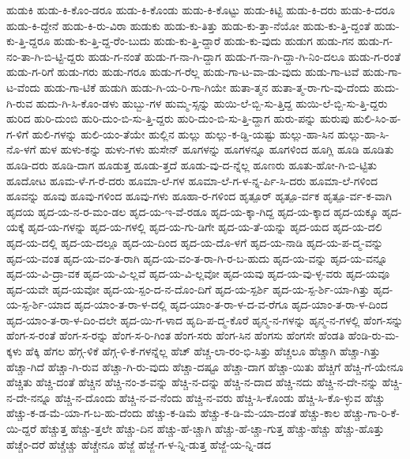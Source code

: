 {ಹುಡುಕಿ
ಹುಡು-ಕಿ-ಕೊಂ-ಡರೂ
ಹುಡು-ಕಿ-ಕೊಂಡು
ಹುಡು-ಕಿ-ಕೊಟ್ಟು
ಹುಡು-ಕಿಟ್ಟಿ
ಹುಡು-ಕಿ-ದರು
ಹುಡು-ಕಿ-ದರೂ
ಹುಡು-ಕಿ-ದ್ದೇನೆ
ಹುಡು-ಕಿ-ರು-ವಿರಾ
ಹುಡುಕು
ಹುಡು-ಕು-ತಿತ್ತು
ಹುಡು-ಕು-ತ್ತಾ-ನೆಯೋ
ಹುಡು-ಕು-ತ್ತಿ-ದ್ದಂತೆ
ಹುಡು-ಕು-ತ್ತಿ-ದ್ದರೂ
ಹುಡು-ಕು-ತ್ತಿ-ದ್ದ-ರೆಂ-ಬುದು
ಹುಡು-ಕು-ತ್ತಿ-ದ್ದಾರೆ
ಹುಡು-ಕು-ವುದು
ಹುಡುಗ
ಹುಡು-ಗನ
ಹುಡು-ಗ-ನಂ-ತಾ-ಗಿ-ಬಿ-ಟ್ಟಿ-ದ್ದರು
ಹುಡು-ಗ-ನಂತೆ
ಹುಡು-ಗ-ನಾ-ಗಿ-ದ್ದಾಗ
ಹುಡು-ಗ-ನಾ-ಗಿ-ದ್ದಾ-ಗಿ-ನಿಂ-ದಲೂ
ಹುಡು-ಗ-ರಂತೆ
ಹುಡು-ಗ-ರಿಗೆ
ಹುಡು-ಗರು
ಹುಡು-ಗರೂ
ಹುಡು-ಗ-ರೆಲ್ಲ
ಹುಡು-ಗಾ-ಟ-ವಾ-ಡು-ವುದು
ಹುಡು-ಗಾ-ಟವೆ
ಹುಡು-ಗಾ-ಟ-ವೆಂದು
ಹುಡು-ಗಾ-ಟಿಕೆ
ಹುಡುಗಿ
ಹುಡು-ಗಿ-ಯ-ರಿ-ಗಾ-ಗಿಯೇ
ಹುತಾ-ತ್ಮನ
ಹುತಾ-ತ್ಮ-ರಾ-ಗು-ವು-ದೆಂದು
ಹುದು-ಗಿ-ರುವ
ಹುದು-ಗಿ-ಸಿ-ಕೊಂ-ಡಳು
ಹುಬ್ಬು-ಗಳ
ಹುಮ್ಮ-ಸ್ಸನ್ನು
ಹುಯಿ-ಲೆ-ಬ್ಬಿ-ಸು-ತ್ತಿದ್ದ
ಹುಯಿ-ಲೆ-ಬ್ಬಿ-ಸು-ತ್ತಿ-ದ್ದರು
ಹುರಿದ
ಹುರಿ-ದುಂಬಿ
ಹುರಿ-ದುಂ-ಬಿ-ಸು-ತ್ತಿ-ದ್ದರು
ಹುರಿ-ದುಂ-ಬಿ-ಸು-ತ್ತಿ-ದ್ದಾಗ
ಹುರು-ಪನ್ನು
ಹುರುಪು
ಹುಲಿ-ಸಿಂ-ಹ-ಗ-ಳಿಗೆ
ಹುಲಿ-ಗಳನ್ನು
ಹುಲಿ-ಯಂ-ತೆಯೇ
ಹುಲ್ಲಿನ
ಹುಲ್ಲು
ಹುಲ್ಲು-ಕ-ಡ್ಡಿ-ಯಷ್ಟು
ಹುಲ್ಲು-ಹಾ-ಸಿನ
ಹುಲ್ಲು-ಹಾ-ಸಿ-ನೊ-ಳಗೆ
ಹುಳ
ಹುಳು-ಕನ್ನು
ಹುಳು-ಗಳು
ಹುಸೇನ್
ಹೂಗಳನ್ನು
ಹೂಗಳನ್ನೂ
ಹೂಗಳಿಂದ
ಹೂಗ್ಲಿ
ಹೂಡಿ
ಹೂಡಿತು
ಹೂಡಿ-ದರು
ಹೂಡಿ-ದಾಗ
ಹೂಡುತ್ತ
ಹೂಡು-ತ್ತದೆ
ಹೂಡು-ವು-ದ-ನ್ನೆಲ್ಲ
ಹೂಣರು
ಹೂತು-ಹೋ-ಗಿ-ಬಿ-ಟ್ಟಿತು
ಹೂದೋಟ
ಹೂಮ-ಳೆ-ಗ-ರೆ-ದರು
ಹೂಮಾ-ಲೆ-ಗಳ
ಹೂಮಾ-ಲೆ-ಗ-ಳ-ನ್ನ-ರ್ಪಿ-ಸಿ-ದರು
ಹೂಮಾ-ಲೆ-ಗಳಿಂದ
ಹೂವನ್ನು
ಹೂವು
ಹೂವು-ಗಳಿಂದ
ಹೂವು-ಗಳು
ಹೂಹಾ-ರ-ಗಳಿಂದ
ಹೃತ್ಪೂರ್
ಹೃತ್ಪೂ-ರ್ವಕ
ಹೃತ್ಪೂ-ರ್ವ-ಕ-ವಾಗಿ
ಹೃದಯ
ಹೃದ-ಯ-ನ-ರ-ಮಂ-ಡಲ
ಹೃದ-ಯ-ಇ-ವೆ-ರಡೂ
ಹೃದ-ಯ-ಕ್ಕಾ-ಗಿದ್ದ
ಹೃದ-ಯ-ಕ್ಕಾದ
ಹೃದ-ಯಕ್ಕೂ
ಹೃದ-ಯಕ್ಕೆ
ಹೃದ-ಯ-ಗಳನ್ನು
ಹೃದ-ಯ-ಗಳಲ್ಲಿ
ಹೃದ-ಯ-ಗು-ಡಿಗೇ
ಹೃದ-ಯ-ತೆ-ಯನ್ನು
ಹೃದ-ಯದ
ಹೃದ-ಯ-ದಲಿ
ಹೃದ-ಯ-ದಲ್ಲಿ
ಹೃದ-ಯ-ದಲ್ಲೂ
ಹೃದ-ಯ-ದಿಂದ
ಹೃದ-ಯ-ದೊ-ಳಗೆ
ಹೃದ-ಯ-ನಾಡಿ
ಹೃದ-ಯ-ಪ-ದ್ಮ-ವನ್ನು
ಹೃದ-ಯ-ವಂತ
ಹೃದ-ಯ-ವಂ-ತ-ರಾಗಿ
ಹೃದ-ಯ-ವಂ-ತ-ರಾ-ಗಿ-ರ-ಬ-ಹುದು
ಹೃದ-ಯ-ವನ್ನು
ಹೃದ-ಯ-ವನ್ನೂ
ಹೃದ-ಯ-ವಿ-ದ್ರಾ-ವಕ
ಹೃದ-ಯ-ವಿ-ಲ್ಲವೆ
ಹೃದ-ಯ-ವಿ-ಲ್ಲವೋ
ಹೃದ-ಯವು
ಹೃದ-ಯ-ವು-ಳ್ಳ-ವರು
ಹೃದ-ಯವೂ
ಹೃದ-ಯವೇ
ಹೃದ-ಯವೋ
ಹೃದ-ಯ-ಸ್ಪಂ-ದ-ನ-ದೊಂ-ದಿಗೆ
ಹೃದ-ಯ-ಸ್ಪರ್ಶಿ
ಹೃದ-ಯ-ಸ್ಪ-ರ್ಶಿ-ಯಾ-ಗಿತ್ತು
ಹೃದ-ಯ-ಸ್ಪ-ರ್ಶಿ-ಯಾದ
ಹೃದ-ಯಾಂ-ತ-ರಾ-ಳ-ದಲ್ಲಿ
ಹೃದ-ಯಾಂ-ತ-ರಾ-ಳ-ದ-ವ-ರೆಗೂ
ಹೃದ-ಯಾಂ-ತ-ರಾ-ಳ-ದಿಂದ
ಹೃದ-ಯಾಂ-ತ-ರಾ-ಳ-ದಿಂ-ದಲೇ
ಹೃದ-ಯಿ-ಗ-ಳಾದ
ಹೃದಿ-ಪ-ದ್ಮ-ಕೊರೆ
ಹೃನ್ಮ-ನ-ಗಳನ್ನು
ಹೃನ್ಮ-ನ-ಗಳಲ್ಲಿ
ಹೆಂಗ-ಸನ್ನು
ಹೆಂಗ-ಸ-ರಂತೆ
ಹೆಂಗ-ಸ-ರನ್ನು
ಹೆಂಗ-ಸ-ರಿ-ಗಿಂತ
ಹೆಂಗ-ಸರು
ಹೆಂಗ-ಸಿನ
ಹೆಂಗಸು
ಹೆಂಗಸೇ
ಹೆಂಡತಿ
ಹೆಂಡಿ-ರು-ಮ-ಕ್ಕಳು
ಹೆಕ್ಕಿ
ಹೆಗಲ
ಹೆಗ್ಗ-ಳಿಕೆ
ಹೆಗ್ಗ-ಳಿ-ಕೆ-ಗಳನ್ನೆಲ್ಲ
ಹೆಚ್
ಹೆಚ್ಚ-ಲಾ-ರಂ-ಭಿ-ಸಿತ್ತು
ಹೆಚ್ಚಲೂ
ಹೆಚ್ಚಾಗಿ
ಹೆಚ್ಚಾ-ಗಿತ್ತು
ಹೆಚ್ಚಾ-ಗಿದೆ
ಹೆಚ್ಚಾ-ಗಿ-ರುವ
ಹೆಚ್ಚಾ-ಗಿ-ರು-ವುದು
ಹೆಚ್ಚಾ-ದಷ್ಟೂ
ಹೆಚ್ಚಾ-ದಾಗ
ಹೆಚ್ಚಾ-ಯಿತು
ಹೆಚ್ಚಿಗೆ
ಹೆಚ್ಚಿ-ಗೆ-ಯೇನೂ
ಹೆಚ್ಚಿತು
ಹೆಚ್ಚಿ-ದಂತೆ
ಹೆಚ್ಚಿನ
ಹೆಚ್ಚಿ-ನಂ-ಶ-ವನ್ನು
ಹೆಚ್ಚಿ-ನ-ದನ್ನು
ಹೆಚ್ಚಿ-ನ-ದಾದ
ಹೆಚ್ಚಿ-ನದು
ಹೆಚ್ಚಿ-ನ-ದೇ-ನನ್ನು
ಹೆಚ್ಚಿ-ನ-ದೇ-ನನ್ನೂ
ಹೆಚ್ಚಿ-ನ-ದೊಂದು
ಹೆಚ್ಚಿ-ನ-ವ-ನೆಂದು
ಹೆಚ್ಚಿ-ನ-ವರು
ಹೆಚ್ಚಿ-ಸಿ-ಕೊಂಡು
ಹೆಚ್ಚಿ-ಸಿ-ಕೊ-ಳ್ಳುವ
ಹೆಚ್ಚು
ಹೆಚ್ಚು-ಕ-ಡ-ಮೆ-ಯಾ-ಗ-ಬ-ಹು-ದೆಂದು
ಹೆಚ್ಚು-ಕ-ಡಿಮೆ
ಹೆಚ್ಚು-ಕ-ಡಿ-ಮೆ-ಯಾ-ದಂತೆ
ಹೆಚ್ಚು-ಕಾಲ
ಹೆಚ್ಚು-ಗಾ-ರಿ-ಕೆ-ಯಿ-ದ್ದರೆ
ಹೆಚ್ಚುತ್ತ
ಹೆಚ್ಚು-ತ್ತಲೇ
ಹೆಚ್ಚು-ದಿನ
ಹೆಚ್ಚು-ಹೆ-ಚ್ಚಾಗಿ
ಹೆಚ್ಚು-ಹೆ-ಚ್ಚಾ-ಗುತ್ತ
ಹೆಚ್ಚು-ಹೆಚ್ಚು
ಹೆಚ್ಚು-ಹೊತ್ತು
ಹೆಚ್ಚೆಂ-ದರೆ
ಹೆಚ್ಚೆಚ್ಚು
ಹೆಚ್ಚೇನೂ
ಹೆಜ್ಜೆ
ಹೆಜ್ಜೆ-ಗ-ಳ-ನ್ನಿ-ಡುತ್ತ
ಹೆಜ್ಜೆ-ಯ-ನ್ನಿ-ಡದ
}
